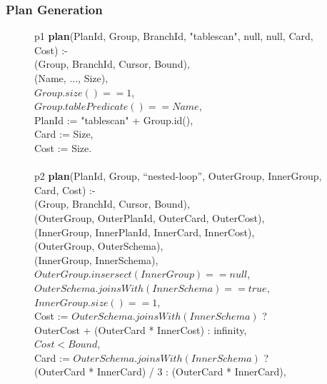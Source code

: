 \subsubsection{Plan Generation}

\begin{figure}
\ssp
\centering
\begin{boxedminipage}{\linewidth}
p1 {\bf plan}(PlanId, Group, BranchId, "tablescan", null, null, Card, Cost) :- \\
(Group, BranchId, Cursor, Bound), \\
(Name, $\ldots$, Size), \\
\datalogspace $Group.size() == 1$, \\
\datalogspace $Group.tablePredicate() == Name$, \\
\datalogspace PlanId := "tablescan" + Group.id(), \\
\datalogspace Card := Size, \\
\datalogspace Cost := Size. \\
\\
p2 {\bf plan}(PlanId, Group, ``nested-loop'', OuterGroup, InnerGroup, Card, Cost) :- \\
(Group, BranchId, Cursor, Bound), \\
(OuterGroup, OuterPlanId, OuterCard, OuterCost), \\
(InnerGroup, InnerPlanId, InnerCard, InnerCost), \\
(OuterGroup, OuterSchema), \\
(InnerGroup, InnerSchema), \\
\datalogspace $OuterGroup.insersect(InnerGroup) ==  null$, \\
\datalogspace $OuterSchema.joinsWith(InnerSchema) ==  true$, \\
\datalogspace $InnerGroup.size() == 1$, \\
\datalogspace Cost := $OuterSchema.joinsWith(InnerSchema)$ ? \\
\datalogspace \datalogspace OuterCost + (OuterCard * InnerCost) : infinity, \\
\datalogspace $Cost < Bound$, \\
\datalogspace Card := $OuterSchema.joinsWith(InnerSchema)$ ? \\
\datalogspace \datalogspace (OuterCard * InnerCard) / 3 : (OuterCard * InnerCard), \\

\end{boxedminipage}
\end{figure}
